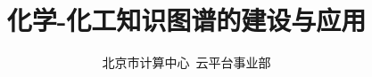 
\title{化学-化工知识图谱的建设与应用}
\author[ ]{北京市计算中心~云平台事业部}   %
\renewcommand*{\Authfont}{\small\rm} %
\renewcommand*{\Affilfont}{\small\it} %
\renewcommand\Authands{ and } %
\renewcommand\Authands{ , } %
\date{} %


\maketitle
